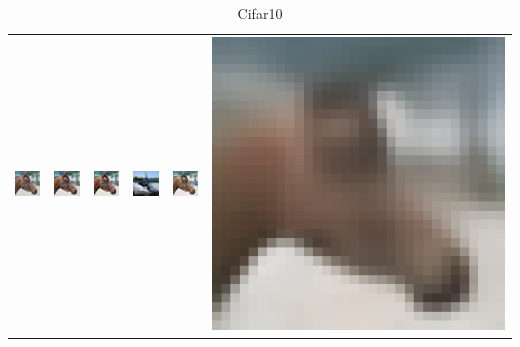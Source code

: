 \begin{table}[h!]
{\begin{tabular}{cccccc}
        \includegraphics[width=.145\textwidth]{chapter4/figures/images/cifar10/original/18.png} &   
        \includegraphics[width=.145\textwidth]{chapter4/figures/images/cifar10/reconstruction/18.png} &
        \includegraphics[width=.145\textwidth]{chapter4/figures/images/cifar10/corrected_reconstruction/18.png} &
        \includegraphics[width=.145\textwidth]{chapter4/figures/images/cifar10/diffusion_decoder_beta_0.01/18.png} &
        \includegraphics[width=.145\textwidth]{chapter4/figures/images/cifar10/diffusion_decoder_beta_0/18.png} &
        \includegraphics[width=.145\textwidth]{chapter4/figures/images/cifar10/VAE_reconstruction/18.png} \\
    \end{tabular}}
    \caption{Cifar10}
    \label{ch4:fig:cifar10_qualitative_comparison}
\end{table}
